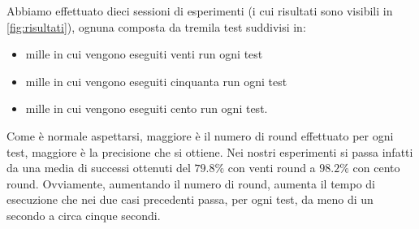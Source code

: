 				Abbiamo effettuato dieci sessioni di esperimenti (i cui risultati sono visibili in \cref{fig:risultati}), ognuna composta da tremila test suddivisi in:
				\begin{itemize}
					\item mille in cui vengono eseguiti venti run ogni test
					\item mille in cui vengono eseguiti cinquanta run ogni test
					\item mille in cui vengono eseguiti cento run ogni test.
				\end{itemize}
				
				Come è normale aspettarsi, maggiore è il numero di round effettuato per ogni test, maggiore è la precisione che si ottiene. Nei nostri esperimenti si passa infatti da una media di successi ottenuti del $79.8\%$ con venti round a $98.2\%$ con cento round. Ovviamente, aumentando il numero di round, aumenta il tempo di esecuzione che nei due casi precedenti passa, per ogni test, da meno di un secondo a circa cinque secondi.
					
